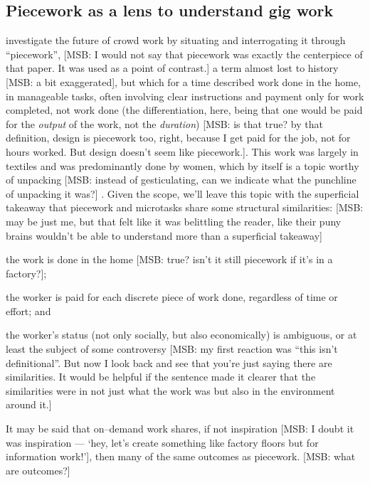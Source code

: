 \documentclass{sigchi}
\newcommand{\msb}[1]{{\color{PineGreen}[MSB: #1]}}
\begin{document}
\subsection{Piecework as a lens to understand gig work}
\citeauthor{crowdworkFuture}
investigate the future of crowd work by
situating and interrogating it through ``piecework'',
\msb{I would not say that piecework was exactly the centerpiece of that paper. It was used as a point of contrast.}
a term almost lost to history \msb{a bit exaggerated}, but which for a time described
work done in the home,
in manageable tasks,
often involving clear instructions
and payment only for work completed, not work done
(the differentiation, here, being that
one would be paid for the \textit{output} of the work,
not the \textit{duration})
\cite{crowdworkFuture} \msb{is that true? by that definition, design is piecework too, right, because I get paid for the job, not for hours worked. But design doesn't seem like piecework.}.
This work was largely in textiles and was predominantly done by women,
which by itself is a topic worthy of unpacking \msb{instead of gesticulating, can we indicate what the punchline of unpacking it was?}
\cite{scott1975women}.
Given the scope, 
we'll leave this topic with the superficial takeaway that
piecework and microtasks share some structural similarities:
\msb{may be just me, but that felt like it was belittling the reader, like their puny brains wouldn't be able to understand more than a superficial takeaway}
\begin{inlinelist}
\item the work is done in the home \msb{true? isn't it still piecework if it's in a factory?};
\item the worker is paid for each discrete piece of work done, regardless of time or effort; and
\item the worker's status
(not only socially, but also economically)
is ambiguous, or at least the subject of some controversy \msb{my first reaction was ``this isn't definitional''. But now I look back and see that you're just saying there are similarities. It would be helpful if the sentence made it clearer that the similarities were in not just what the work was but also in the environment around it.}
\end{inlinelist}
It may be said that
on--demand work shares, if not inspiration \msb{I doubt it was inspiration --- `hey, let's create something like factory floors but for information work!'}, then many of the same outcomes as piecework. \msb{what are outcomes?}
\end{document}
